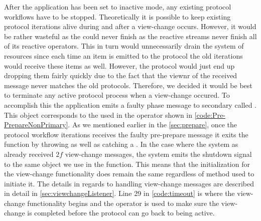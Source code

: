 After the application has been set to inactive mode, any existing protocol workflows have to be stopped. Theoretically it is possible to keep existing protocol iterations alive during and after a view-change occurs. However, it would be rather wasteful as the  could never finish as the reactive streams never finish all of its reactive operators.  This in turn would unnecessarily drain the system of resources since each time an item is emitted to the protocol  the old iterations would receive these items as well. However, the protocol would just end up dropping them fairly quickly due to the fact that the viewnr of the received message never matches the old protocols. Therefore, we decided it would be best to terminate any active protocol process when a view-change occured. To accomplish this the application emits a faulty phase message to secondary  called . This  object corresponds to the  used in the  operator shown in \autoref{code:Pre-PrepareNonPrimary}. As we mentioned earlier in the \autoref{sec:prepare}, once the protocol workflow iterations receives the faulty pre-prepare message it exits the function by throwing as well as catching a . In the case where the system as already received $2f$ view-change messages, the system emits the shutdown signal to the same   object we use in the   function. This means that the initialization for the view-change functionality does remain the same regardless of method used to initiate it. The details in regards to handling view-change messages are described in detail in  \autoref{sec:viewchangeListener}. Line 29 in \autoref{code:timeout} is where the view-change functionality begins and the  operator is used to make sure the view-change is completed before the protocol can go back to being active. 

